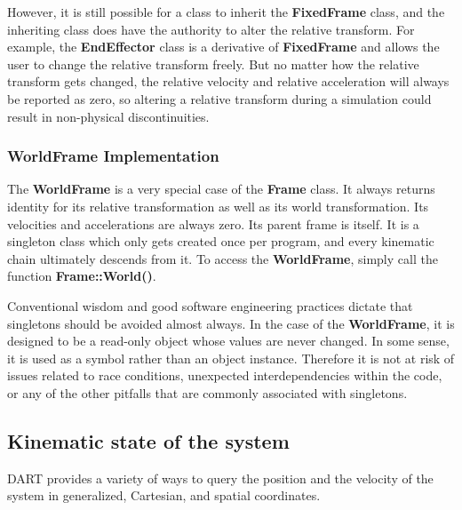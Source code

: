 However, it is still possible for a class to inherit the \textbf{FixedFrame} class, and the inheriting class does have the authority to alter the relative transform. For example, the \textbf{EndEffector} class is a derivative of \textbf{FixedFrame} and allows the user to change the relative transform freely. But no matter how the relative transform gets changed, the relative velocity and relative acceleration will always be reported as zero, so altering a relative transform during a simulation could result in non-physical discontinuities.

\subsubsection{WorldFrame Implementation}

The \textbf{WorldFrame} is a very special case of the \textbf{Frame} class. It always returns identity for its relative transformation as well as its world transformation. Its velocities and accelerations are always zero. Its parent frame is itself. It is a singleton class which only gets created once per program, and every kinematic chain ultimately descends from it. To access the \textbf{WorldFrame}, simply call the function \textbf{Frame::World()}.

Conventional wisdom and good software engineering practices dictate that singletons should be avoided almost always. In the case of the \textbf{WorldFrame}, it is designed to be a read-only object whose values are never changed. In some sense, it is used as a symbol rather than an object instance. Therefore it is not at risk of issues related to race conditions, unexpected interdependencies within the code, or any of the other pitfalls that are commonly associated with singletons.

\subsection{Kinematic state of the system}
DART provides a variety of ways to query the position and the velocity of the system in generalized, Cartesian, and spatial coordinates. 

